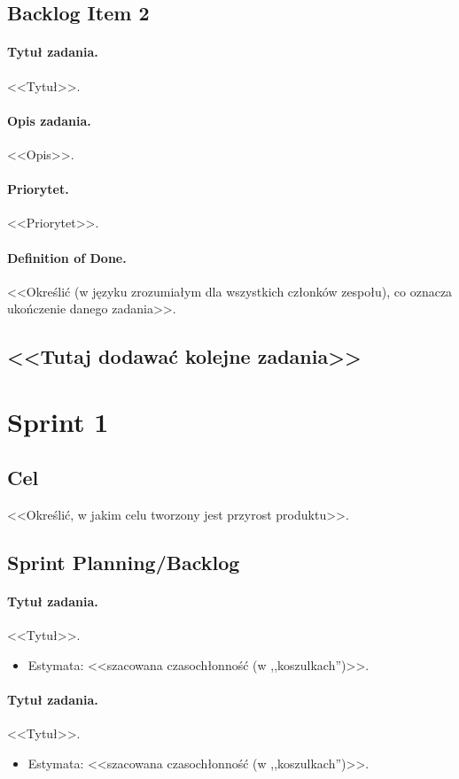 \documentclass[a4paper]{article}
\begin{document}
\subsection{Backlog Item 2}
\paragraph{Tytuł zadania.} <<Tytuł>>.
\paragraph{Opis zadania.} <<Opis>>.
\paragraph{Priorytet.} <<Priorytet>>.
\paragraph{Definition of Done.} <<Określić (w języku zrozumiałym dla wszystkich członków zespołu), co oznacza ukończenie danego zadania>>.

\subsection*{<<Tutaj dodawać kolejne zadania>>}

\section{Sprint 1}
\subsection{Cel} <<Określić, w jakim celu tworzony jest przyrost produktu>>.
\subsection{Sprint Planning/Backlog}

\paragraph{Tytuł zadania.} <<Tytuł>>.
\begin{itemize}
\item Estymata: <<szacowana czasochłonność (w ,,koszulkach'')>>.
\end{itemize}

\paragraph{Tytuł zadania.} <<Tytuł>>.
\begin{itemize}
\item Estymata: <<szacowana czasochłonność (w ,,koszulkach'')>>.
\end{itemize}
\end{document}
